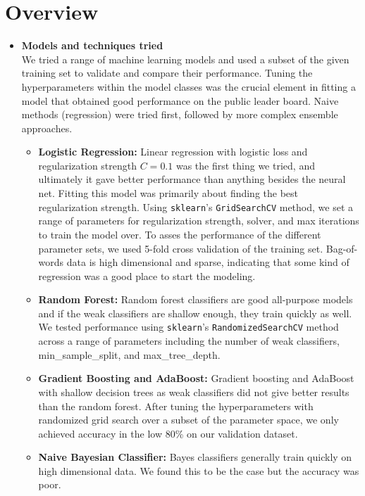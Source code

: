 \section{Overview}
\medskip
\begin{itemize}
	
	\item \textbf{Models and techniques tried}\\
	
	We tried a range of machine learning models and used a subset of the given training set to validate and compare their performance. Tuning the hyperparameters within the model classes was the crucial element in fitting a model that obtained good performance on the public leader board. Naive methods (regression) were tried first, followed by more complex ensemble approaches. 
	\begin{itemize}
		\item \textbf{Logistic Regression:} Linear regression with logistic loss and regularization strength $C=0.1$ was the first thing we tried, and ultimately it gave better performance than anything besides the neural net. Fitting this model was primarily about finding the best regularization strength. Using \texttt{sklearn}'s \texttt{GridSearchCV} method, we set a range of parameters for regularization strength, solver, and max iterations to train the model over. To asses the performance of the different parameter sets, we used 5-fold cross validation of the training set. Bag-of-words data is high dimensional and sparse, indicating that some kind of regression was a good place to start the modeling. 
		\item \textbf{Random Forest:} Random forest classifiers are good all-purpose models and if the weak classifiers are shallow enough, they train quickly as well. We tested performance using \texttt{sklearn}'s \texttt{RandomizedSearchCV} method across a range of parameters including the number of weak classifiers, min\_sample\_split, and max\_tree\_depth. 
		\item \textbf{Gradient Boosting and AdaBoost:} Gradient boosting and AdaBoost with shallow decision trees as weak classifiers did not give better results than the random forest. After tuning the hyperparameters with randomized grid search over a subset of the parameter space, we only achieved accuracy in the low 80\% on our validation dataset. 
		\item \textbf{Naive Bayesian Classifier:} Bayes classifiers generally train quickly on high dimensional data. We found this to be the case but the accuracy was poor. 

\end{itemize}
\end{itemize}
